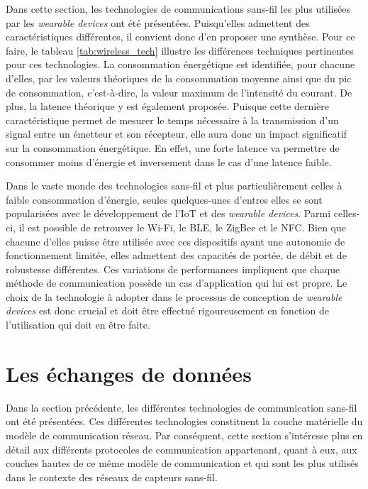 Dans cette section, les technologies de communications sans-fil les plus utilisées par les \textit{wearable devices} ont été présentées. Puisqu'elles admettent des caractéristiques différentes, il convient donc d'en proposer une synthèse. Pour ce faire, le tableau \ref{tab:wireless_tech} illustre les différences techniques pertinentes pour ces technologies. La consommation énergétique est identifiée, pour chacune d'elles, par les valeurs théoriques de la consommation moyenne ainsi que du pic de consommation, c'est-à-dire, la valeur maximum de l'intensité du courant. De plus, la latence théorique y est également proposée. Puisque cette dernière caractéristique permet de mesurer le temps nécessaire à la transmission d'un signal entre un émetteur et son récepteur, elle aura donc un impact significatif sur la consommation énergétique. En effet, une forte latence va permettre de consommer moins d'énergie et inversement dans le cas d'une latence faible.

Dans le vaste monde des technologies sans-fil et plus particulièrement celles à faible consommation d'énergie, seules quelques-unes d'entres elles se sont popularisées avec le développement de l'\acs{IoT} et des \textit{wearable devices}. Parmi celles-ci, il est possible de retrouver le Wi-Fi, le \acs{BLE}, le ZigBee et le \acs{NFC}. Bien que chacune d'elles puisse être utilisée avec ces dispositifs ayant une autonomie de fonctionnement limitée, elles admettent des capacités de portée, de débit et de robustesse différentes. Ces variations de performances impliquent que chaque méthode de communication possède un cas d'application qui lui est propre. Le choix de la technologie à adopter dans le processus de conception de \textit{wearable devices} est donc crucial et doit être effectué rigoureusement en fonction de l'utilisation qui doit en être faite.

\section{Les échanges de données}

Dans la section précédente, les différentes technologies de communication sans-fil ont été présentées. Ces différentes technologies constituent la couche matérielle du modèle de communication réseau. Par conséquent, cette section s'intéresse plus en détail aux différents protocoles de communication appartenant, quant à eux, aux couches hautes de ce même modèle de communication et qui sont les plus utilisés dans le contexte des réseaux de capteurs sans-fil.

